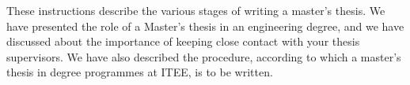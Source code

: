 These instructions describe the various stages of writing a master’s thesis. We have presented the role of a Master's thesis in an engineering degree, and we have discussed about the importance of keeping close contact with your thesis supervisors. We have also described the procedure, according to which a master's thesis in degree programmes at ITEE, is to be written.